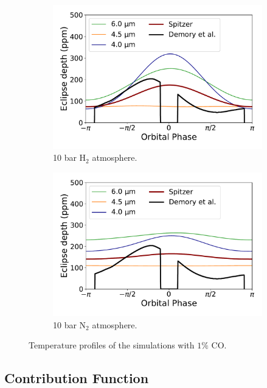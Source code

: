 \begin{figure}
  \centering
  \begin{subfigure}[t]{0.49\textwidth}
    \includegraphics[width=\textwidth]{figures/soc-lava-planets/n2-spec-pc.pdf}
    \caption{10 bar H$_{2}$ atmosphere.}\label{fig:soc-tp-h2}
  \end{subfigure}
  \begin{subfigure}[t]{0.49\textwidth}
    \includegraphics[width=\textwidth]{figures/soc-lava-planets/h2-spec-pc.pdf}
    \caption{10 bar N$_{2}$ atmosphere.}\label{fig:soc-tp-n2}
  \end{subfigure}
  \caption{Temperature profiles of the simulations with $1\%$ CO.}
  \label{fig:soc-tp}
\end{figure}

\subsection{Contribution Function}


